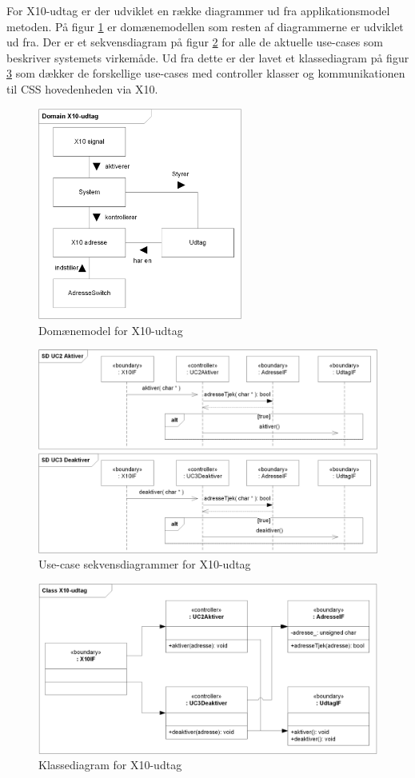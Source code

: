 For X10-udtag er der udviklet en række diagrammer ud fra applikationsmodel metoden.
På figur \ref{fig:X10_udtag_domain} er domænemodellen som resten af diagrammerne er udviklet ud fra.
Der er et sekvensdiagram på figur \ref{fig:X10_udtag_SD} for alle de aktuelle use-cases som beskriver systemets virkemåde.
Ud fra dette er der lavet et klassediagram på figur \ref{fig:X10_udtag_Class} som dækker de forskellige use-cases med controller klasser og kommunikationen til CSS hovedenheden via X10.


\begin{figure}[!htb] \centering
\centering \includegraphics[width=0.6\textwidth]{billeder/uml/X10_modtager_Domain}
     \caption{Domænemodel for X10-udtag}
     \label{fig:X10_udtag_domain}
\end{figure}

\begin{figure}[!htb]
	\includegraphics[width=\textwidth]{billeder/uml/X10_modtager_SD}
     \caption{Use-case sekvensdiagrammer for X10-udtag}
     \label{fig:X10_udtag_SD}
\end{figure}

\begin{figure}[!htb]
     \includegraphics[width=\textwidth]{billeder/uml/X10_modtager_Class}
     \caption{Klassediagram for X10-udtag}
     \label{fig:X10_udtag_Class}
\end{figure}
